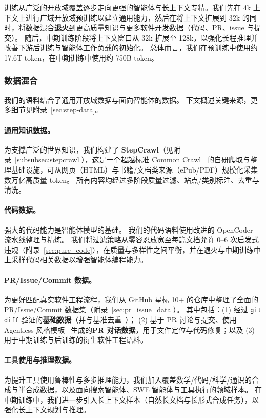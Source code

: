 训练从广泛的开放域覆盖逐步走向更强的智能体与长上下文专精。我们先在 {4k} 上下文上进行广域开放域预训练以建立通用能力，然后在将上下文扩展到 {32k} 的同时，将数据混合\textbf{退火}到更高质量知识与更多软件开发数据（代码、PR、issue 与提交）。
随后，中期训练阶段将上下文窗口从 32k 扩展至 128k，以强化长程推理并改善下游后训练与智能体工作负载的初始化。
总体而言，我们在预训练中使用约 17.6T token，在中期训练中使用约 750B token。

\subsubsection{数据混合}
\label{sec:training_data}

\noindent 我们的语料结合了通用开放域数据与面向智能体的数据。
下文概述关键来源，更多细节见附录~\ref{sec:step-data}。


\paragraph{通用知识数据。}
为支撑广泛的世界知识，我们构建了 \textbf{StepCrawl}（见附录~\ref{subsubsec:stepcrawl}），这是一个超越标准 Common Crawl~\cite{commoncrawl} 的自研爬取与整理基础设施，可从网页（HTML）与书籍/文档类来源（ePub/PDF）规模化采集数万亿高质量 token。
所有内容均经过多阶段质量过滤、站点/类别标注、去重与清洗。


\paragraph{代码数据。}
强大的代码能力是智能体模型的基础。
我们的代码语料使用改进的 OpenCoder~\cite{huang2025opencoderopencookbooktoptier} 流水线整理与精炼。
我们将过滤策略从零容忍放宽至每篇文档允许 0--6 次启发式违规（附录~\ref{sec:pure_code}），在质量与多样性之间平衡，并在退火与中期训练中上采样代码相关数据以增强智能体编程能力。

\paragraph{PR/Issue/Commit 数据。}
为更好匹配真实软件工程流程，我们从 GitHub 星标 10+ 的仓库中整理了全面的 PR/Issue/Commit 数据集（附录~\ref{sec:pr_issue_data}）。
其中包括：(1) 经过 \texttt{git diff} 验证的\textbf{基础数据}（并与基准去重~\cite{jimenez2024swebench,yang2025swesmith}）；
(2) 基于 PR 讨论与提交、使用 Agentless 风格模板~\cite{xia2024agentless} 生成的\textbf{PR 对话数据}，用于文件定位与代码修复；以及
(3) 用于中期训练与后训练的衍生软件工程语料。

\paragraph{工具使用与推理数据。}
为提升工具使用鲁棒性与多步推理能力，我们加入覆盖数学/代码/科学/通识的合成与半合成数据，以及面向搜索智能体、SWE 智能体与工具执行的领域样本。
在中期训练中，我们进一步引入长上下文样本（自然长文档与长形式合成任务），以强化长上下文规划与推理。


